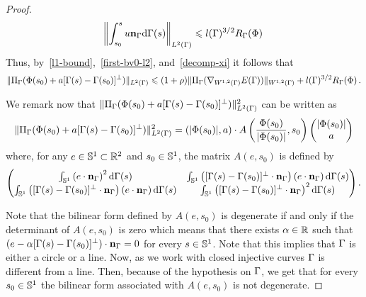 \begin{proof}
\begin{equation}
\left\|\int_{s_0}^s u\mathbf{n}_\Gamma \mathrm{d} \Gamma(s)\right\|_{L^2(\Gamma)}\leqslant
l(\Gamma)^{3/2} R_\Gamma(\Phi)\,
 \end{equation}
Thus, by~\eqref{l1-bound},~\eqref{first-bv0-l2}, and~\eqref{decomp-xi} it follows that
\begin{equation}\label{bound-xi}
\|\Pi_\Gamma(\Phi(s_0)+ a[\Gamma(s)-\Gamma(s_0)]^\bot)\|_{L^2(\Gamma)}\leqslant (1+\rho)\|\Pi_\Gamma(\nabla_{W^{1,2}(\Gamma)}E(\Gamma))\|_{W^{1,2}(\Gamma)}+ l(\Gamma)^{3/2}R_\Gamma(\Phi)\,.
\end{equation}
\par We remark now that $\|\Pi_\Gamma(\Phi(s_0)+ a[\Gamma(s)-\Gamma(s_0)]^\bot)\|_{L^2(\Gamma)}^2$ can be written as   
\begin{equation}\label{bilinear}
\|\Pi_\Gamma(\Phi(s_0)+a[\Gamma(s)-\Gamma(s_0)]^\bot)\|_{L^2(\Gamma)}^2=(|\Phi(s_0)|, a)\cdot A\left(\frac{\Phi(s_0)}{|\Phi(s_0)|},s_0\right)
\begin{pmatrix}
|\Phi(s_0)|\\
a\\
\end{pmatrix}
\end{equation}
where, for any $e\in \mathbb{S}^1\subset \mathbb{R}^2$ and $s_0\in \mathbb{S}^1$, the matrix $A(e,s_0)$ is defined by
\begin{equation}
\begin{pmatrix}
\int_{\mathbb{S}^1} \left(e\cdot\mathbf{n}_\Gamma\right)^2\mathrm{d} \Gamma(s)&\int_{\mathbb{S}^1}\left([\Gamma(s)-\Gamma(s_0)]^\bot\cdot\mathbf{n}_\Gamma\right)\left(e\cdot\mathbf{n}_\Gamma\right) \mathrm{d} \Gamma(s)\\
\int_{\mathbb{S}^1}\left([\Gamma(s)-\Gamma(s_0)]^\bot\cdot\mathbf{n}_\Gamma\right)\left(e\cdot\mathbf{n}_\Gamma\right) \mathrm{d} \Gamma(s)&\int_{\mathbb{S}^1} \left([\Gamma(s)-\Gamma(s_0)]^\bot\cdot\mathbf{n}_\Gamma\right)^2\mathrm{d} \Gamma(s)\\
\end{pmatrix}
.
\end{equation}

\par Note that the bilinear form defined by $A(e,s_0)$ is degenerate if and only if the determinant of $A(e,s_0)$ is zero which means that there exists  $\alpha\in{\mathbb R}$ such that 
$(e- \alpha[\Gamma(s)-\Gamma(s_0)]^\bot)\cdot \mathbf{n}_\Gamma=0$ for every $s\in \mathbb{S}^1$. Note that this  implies that $\Gamma$ is either a circle or a line. Now, as we work with closed injective curves $\Gamma$ is different from a line. Then, because of the hypothesis on $\Gamma$, we get that for every $s_0\in \mathbb{S}^1$ the   bilinear form associated with $A(e,s_0)$  is not degenerate.


\end{proof}
